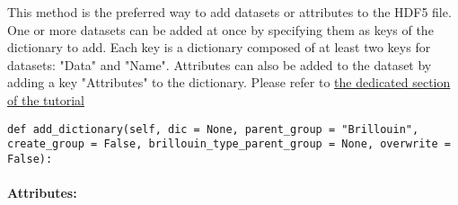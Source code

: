 This method is the preferred way to add datasets or attributes to the HDF5 file. One or more datasets can be added at once by specifying them as keys of the dictionary to add. Each key is a dictionary composed of at least two keys for datasets: "Data" and "Name". Attributes can also be added to the dataset by adding a key "Attributes" to the dictionary. 
Please refer to \hyperref[chapter:HDF5_BLS.wrapper]{the dedicated section of the tutorial}

\begin{lstlisting}
def add_dictionary(self, dic = None, parent_group = "Brillouin", create_group = False, brillouin_type_parent_group = None, overwrite = False):
\end{lstlisting}

\paragraph*{Attributes:}

